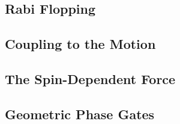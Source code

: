 \subsection{Rabi Flopping}
\label{sec:Rabi Flopping}

\subsection{Coupling to the Motion}
\label{sec:Motional Coupling}

\subsection{The Spin-Dependent Force}
\label{sec:SDF}

\subsection{Geometric Phase Gates}
\label{sec:Geometric Phase Gates}